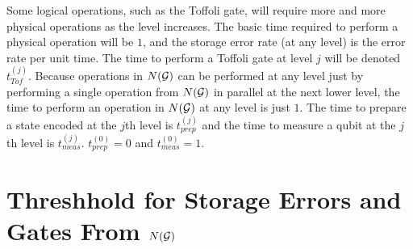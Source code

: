 \documentclass{report}
\newcommand{\G}{{\cal G}}
\newcommand{\tpj}[1]{t_{prep}^{({#1})}}
\newcommand{\tmj}[1]{t_{meas}^{({#1})}}
\begin{document}
Some logical operations, such as the Toffoli gate, will require more and 
more physical operations as the level increases.  The basic time required to 
perform a physical operation will be $1$, and the storage error rate (at any 
level) is the error rate per unit time.  The time to perform a Toffoli gate at 
level $j$ will be denoted $t_{Tof}^{(j)}$.  Because operations in $N(\G)$ can 
be performed at any level just by performing a single operation from 
$N(\G)$ in parallel at the next lower level, the time to perform an 
operation in $N(\G)$ at any level is just $1$.  The time to prepare a state 
encoded at the $j$th level is $t_{prep}^{(j)}$ and the time to measure a 
qubit at the $j$th level is $t_{meas}^{(j)}$.  $\tpj{0} = 0$ and $\tmj{0} = 1$.

\section{Threshhold for Storage Errors and Gates From $N(\G)$}
\end{document}
